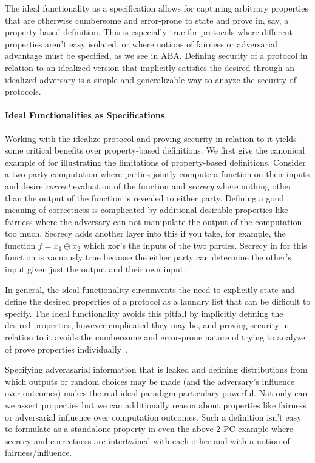 The ideal functionality as a specification allows for capturing arbitrary properties that are otherwise cumbersome and error-prone to state and prove in, say, a property-based definition.
This is especially true for protocols where different properties aren't easy isolated, or where notions of fairness or adversarial advantage must be specified, as we see in ABA.
Defining security of a protocol in relation to an idealized version that implicitly satisfies the desired through an idealized adversary is a simple and generalizable way to anayze the security of protocols.

\paragraph{Ideal Functionalities as Specifications}
Working with the idealize protocol and proving security in relation to it yields some critical benefits over property-based definitions.
We first give the canonical example of for illustrating the limitations of property-based definitions.
Consider a two-party computation where parties jointly compute a function on their inputs and desire \emph{correct} evaluation of the function and \emph{secrecy} where nothing other than the output of the function is revealed to either party.
Defining a good meaning of correctness is complicated by additional desirable properties like fairness where the adversary can not manipulate the output of the computation too much. 
Secrecy adds another layer into this if you take, for example, the function $f = x_1 \oplus x_2$ which xor's the inputs of the two parties. 
Secrecy in for this function is vacuously true because the either party can determine the other's input given just the output and their own input. 

In general, the ideal functionality circumvents the need to explicitly state and define the desired properties of a protocol as a laundry list that can be difficult to specify. 
The ideal functionality avoids this pitfall by implicitly defining the desired properties, however cmplicated they may be, and proving security in relation to it avoids the cumbersome and error-prone nature of trying to analyze of prove properties individually~\cite{uc2006, definingmpc}.

Specifying adverasarial information that is leaked and defining distributions from which outputs or random choices may be made (and the adversary's influence over outcomes) makes the real-ideal paradigm particulary powerful.
Not only can we assert properties but we can additionally reason about properties like fairness or adversarial influence over computation outcomes.
Such a definition isn't easy to formulate as a standalone property in even the above 2-PC example where secrecy and correctness are intertwined with each other and with a notion of fairness/influence.

